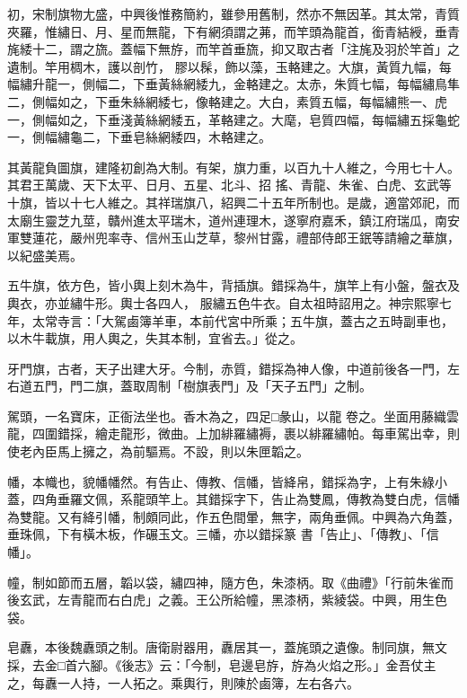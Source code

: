 \begin{pinyinscope}
 初，宋制旗物尢盛，中興後惟務簡約，雖參用舊制，然亦不無因革。其太常，青質夾羅，惟繡日、月、星而無龍，下有網須謂之茀，而竿頭為龍首，銜青結綬，垂青旄緌十二，謂之旒。蓋幅下無斿，而竿首垂旒，抑又取古者「注旄及羽於竿首」之遺制。竿用椆木，護以剖竹，
 膠以髹，飾以藻，玉輅建之。大旗，黃質九幅，每幅繡升龍一，側幅二，下垂黃絲網緌九，金輅建之。太赤，朱質七幅，每幅繡鳥隼二，側幅如之，下垂朱絲網緌七，像輅建之。大白，素質五幅，每幅繡熊一、虎一，側幅如之，下垂淺黃絲網緌五，革輅建之。大麾，皂質四幅，每幅繡五採龜蛇一，側幅繡龜二，下垂皂絲網緌四，木輅建之。



 其黃龍負圖旗，建隆初創為大制。有架，旗力重，以百九十人維之，今用七十人。其君王萬歲、天下太平、日月、五星、北斗、招
 搖、青龍、朱雀、白虎、玄武等十旗，皆以十七人維之。其祥瑞旗八，紹興二十五年所制也。是歲，適當郊祀，而太廟生靈芝九莖，贛州進太平瑞木，道州連理木，遂寧府嘉禾，鎮江府瑞瓜，南安軍雙蓮花，嚴州兜率寺、信州玉山芝草，黎州甘露，禮部侍郎王鈱等請繪之華旗，以紀盛美焉。



 五牛旗，依方色，皆小輿上刻木為牛，背插旗。錯採為牛，旗竿上有小盤，盤衣及輿衣，亦並繡牛形。輿士各四人，
 服繡五色牛衣。自太祖時詔用之。神宗熙寧七年，太常寺言：「大駕鹵簿羊車，本前代宮中所乘；五牛旗，蓋古之五時副車也，以木牛載旗，用人輿之，失其本制，宜省去。」從之。



 牙門旗，古者，天子出建大牙。今制，赤質，錯採為神人像，中道前後各一門，左右道五門，門二旗，蓋取周制「樹旗表門」及「天子五門」之制。



 駕頭，一名寶床，正衙法坐也。香木為之，四足□彖山，以龍
 卷之。坐面用藤織雲龍，四圍錯採，繪走龍形，微曲。上加緋羅繡褥，裹以緋羅繡帕。每車駕出幸，則使老內臣馬上擁之，為前驅焉。不設，則以朱匣韜之。



 幡，本幟也，貌幡幡然。有告止、傳教、信幡，皆絳帛，錯採為字，上有朱綠小蓋，四角垂羅文佩，系龍頭竿上。其錯採字下，告止為雙鳳，傳教為雙白虎，信幡為雙龍。又有絳引幡，制頗同此，作五色間暈，無字，兩角垂佩。中興為六角蓋，垂珠佩，下有橫木板，作碾玉文。三幡，亦以錯採篆
 書「告止」、「傳教」、「信幡」。



 幢，制如節而五層，韜以袋，繡四神，隨方色，朱漆柄。取《曲禮》「行前朱雀而後玄武，左青龍而右白虎」之義。王公所給幢，黑漆柄，紫綾袋。中興，用生色袋。



 皂纛，本後魏纛頭之制。唐衛尉器用，纛居其一，蓋旄頭之遺像。制同旗，無文採，去金□首六腳。《後志》云：「今制，皂邊皂斿，斿為火焰之形。」金吾仗主之，每纛一人持，一人拓之。乘輿行，則陳於鹵簿，左右各六。




\end{pinyinscope}
